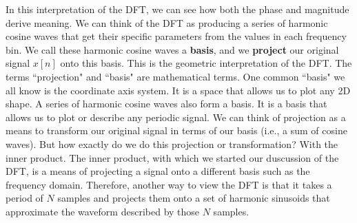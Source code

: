  	In this interpretation of the DFT, we can see how both the phase and magnitude derive meaning.  We can think
 of the DFT as producing a series of harmonic cosine waves that get their specific parameters from the values in each
frequency bin.  We call these harmonic cosine waves a \textbf{basis}, and we \textbf{project} our original signal
$x[n]$ onto this basis.  This is the geometric interpretation of the DFT.  The terms ``projection" and ``basis" are 
mathematical terms.  One common ``basis" we all know is the coordinate axis system.  It is a space that allows us
to plot any 2D shape.  A series of harmonic cosine waves also form a basis.  It is a basis that allows us to 
plot or describe any periodic signal.  We can think of projection as a means to transform our original signal
 in terms of our basis (i.e., a sum of cosine waves).  But how exactly do we do this projection
 or transformation?  With the inner product.  The inner product, with which we started our duscussion of the DFT,
 is a means of projecting a signal onto a different basis such as the frequency domain.  Therefore, another way to
 view the DFT is that it takes a period of $N$ samples and projects them onto a set of harmonic sinusoids that
 approximate the waveform described by those $N$ samples.
